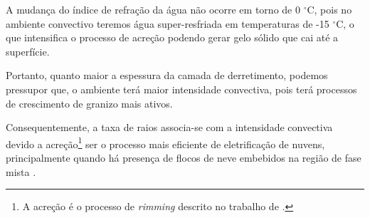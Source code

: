 A mudança do índice de refração da água não ocorre em torno de 0 $^{\circ}$C, pois no ambiente convectivo teremos água super-resfriada em temperaturas de -15 $^{\circ}$C, o que intensifica o processo de acreção podendo gerar gelo sólido que cai até a superfície.

Portanto, quanto maior a espessura da camada de derretimento, podemos pressupor que, o ambiente terá maior intensidade convectiva, pois terá processos de crescimento de granizo mais ativos.

Consequentemente, a taxa de raios associa-se com a intensidade convectiva devido a acreção\footnote{A acreção é o processo de \textit{rimming} descrito no trabalho de .} ser o processo mais eficiente de eletrificação de nuvens, principalmente quando há presença de flocos de neve embebidos na região de fase mista \cite{Takahashi1978,Takahashi2002}. 
